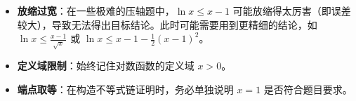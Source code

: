 \begin{trapbox}
\begin{itemize}
    \item \textbf{放缩过宽}：在一些极难的压轴题中，$\ln x \leqslant x-1$ 可能放缩得太厉害（即误差较大），导致无法得出目标结论。此时可能需要用到更精细的结论，如 $\ln x \leqslant \frac{x-1}{\sqrt{x}}$ 或 $\ln x \leqslant x - 1 - \frac{1}{2}(x-1)^2$。
    \item \textbf{定义域限制}：始终记住对数函数的定义域 $x > 0$。
    \item \textbf{端点取等}：在构造不等式链证明时，务必单独说明 $x=1$ 是否符合题目要求。
\end{itemize}
\end{trapbox}